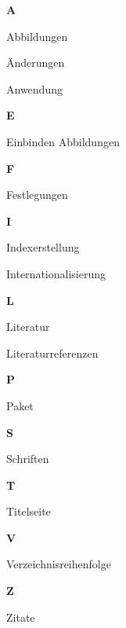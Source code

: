 \begin{theindex}
{\indexfrontskip\Large\sffamily\bfseries\hfill A\hfill}\nopagebreak
 
  \item Abbildungen
  \item \"Anderungen
  \item Anwendung

  \indexspace
{\indexfrontskip\Large\sffamily\bfseries\hfill E\hfill}\nopagebreak
 
  \item Einbinden
    \subitem Abbildungen

  \indexspace
{\indexfrontskip\Large\sffamily\bfseries\hfill F\hfill}\nopagebreak
 
  \item Festlegungen

  \indexspace
{\indexfrontskip\Large\sffamily\bfseries\hfill I\hfill}\nopagebreak
 
  \item Indexerstellung
  \item Internationalisierung

  \indexspace
{\indexfrontskip\Large\sffamily\bfseries\hfill L\hfill}\nopagebreak
 
  \item Literatur
  \item Literaturreferenzen

  \indexspace
{\indexfrontskip\Large\sffamily\bfseries\hfill P\hfill}\nopagebreak
 
  \item Paket

  \indexspace
{\indexfrontskip\Large\sffamily\bfseries\hfill S\hfill}\nopagebreak
 
  \item Schriften

  \indexspace
{\indexfrontskip\Large\sffamily\bfseries\hfill T\hfill}\nopagebreak
 
  \item Titelseite

  \indexspace
{\indexfrontskip\Large\sffamily\bfseries\hfill V\hfill}\nopagebreak
 
  \item Verzeichnisreihenfolge

  \indexspace
{\indexfrontskip\Large\sffamily\bfseries\hfill Z\hfill}\nopagebreak
 
  \item Zitate

\end{theindex}
